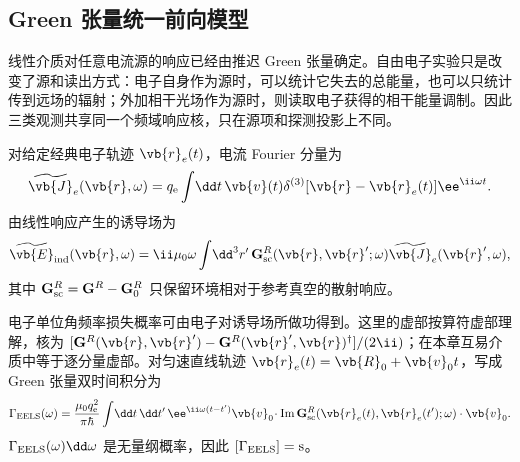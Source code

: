 
\subsection{Green 张量统一前向模型}\label{subsec:green-forward-closure-dp47}

线性介质对任意电流源的响应已经由推迟 Green 张量确定。自由电子实验只是改变了源和读出方式：电子自身作为源时，可以统计它失去的总能量，也可以只统计传到远场的辐射；外加相干光场作为源时，则读取电子获得的相干能量调制。因此三类观测共享同一个频域响应核，只在源项和探测投影上不同。

\begin{definition}[电子源与散射响应]
对给定经典电子轨迹 $\vb{r}_e(t)$，电流 Fourier 分量为
\begin{equation}
 \widetilde{\vb{J}}_e(\vb{r},\omega)
 =q_{\mathrm e}\int\!\dd t\,
 \vb{v}(t)\delta^{(3)}[\vb{r}-\vb{r}_e(t)]\ee^{\ii\omega t}.
\label{eq:electron_current_fourier_dp47}
\end{equation}
由线性响应产生的诱导场为
\begin{equation}
{
 \widetilde{\vb{E}}_{\rm ind}(\vb{r},\omega)
 =\ii\mu_0\omega
 \int\!\dd^3 r'\,
 \mathbf G_{\rm sc}^R(\vb{r},\vb{r}';\omega)
 \widetilde{\vb{J}}_e(\vb{r}',\omega),}
\label{eq:induced_field_green_dp47}
\end{equation}
其中 $\mathbf G_{\rm sc}^R=\mathbf G^R-\mathbf G_0^R$ 只保留环境相对于参考真空的散射响应。

\end{definition}

\begin{proposition}[轨迹上的损失泛函]
电子单位角频率损失概率可由电子对诱导场所做功得到。这里的虚部按算符虚部理解，核为 $[\mathbf G^R(\vb{r},\vb{r}')-\mathbf G^R(\vb{r}',\vb{r})^\dagger]/(2\ii)$；在本章互易介质中等于逐分量虚部。对匀速直线轨迹 $\vb{r}_e(t)=\vb{R}_0+\vb{v}_0t$，写成 Green 张量双时间积分为
\begin{equation}
{
 \Gamma_{\rm EELS}(\omega)
 =\frac{\mu_0q_{\mathrm e}^2}{\pi\hbar}
 \int\!\dd t\,\dd t'\,
 \ee^{\ii\omega(t-t')}
 \vb{v}_0\!\cdot
 \operatorname{Im}\mathbf G_{\rm sc}^R
 (\vb{r}_e(t),\vb{r}_e(t');\omega)
 \cdot\vb{v}_0 .}
\label{eq:eels_green_master_dp47}
\end{equation}
$\Gamma_{\rm EELS}(\omega)\dd\omega$ 是无量纲概率，因此 $[\Gamma_{\rm EELS}]={\rm s}$。

\end{proposition}

